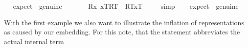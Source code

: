 \begin{isabellebody}
%
\endisadelimproof
\ \isamarkupfalse%
\ {\isacharbrackleft}expect\ {\isacharequal}\ genuine{\isacharbrackright}%
\isadelimproof
\ \ %
\endisadelimproof
%
\isatagproof
{}\isamarkupfalse%
\ %
%
\endisatagproof
{\isafoldproof}%
%
\isadelimproof
%
\endisadelimproof
\isanewline
\ \isamarkupfalse%
\ {\isachardoublequoteopen}{\isacharbrackleft}{\isacharparenleft}\isactrlbold {\isasymforall}R{\isachardot}\isactrlbold {\isasymforall}x{\isachardot}\ {\isasymlbrace}x\isactrlsup T{\isacharcomma}R\isactrlsup T{\isasymrbrace}\ \isactrlbold {\isasymrightarrow}\ {\isasymlparr}R\isactrlsup T{\isacharcomma}x\isactrlsup T{\isasymrparr}{\isacharparenright}{\isacharbrackright}\ {\isacharequal}\ {\isasymtop}{\isachardoublequoteclose}%
\isadelimproof
\ %
\endisadelimproof
%
\isatagproof
{}\isamarkupfalse%
\ simp%
\endisatagproof
{\isafoldproof}%
%
\isadelimproof
%
\endisadelimproof
\ \isamarkupfalse%
\ \ {\isacharbrackleft}expect\ {\isacharequal}\ genuine{\isacharbrackright}%
\isadelimproof
\ %
\endisadelimproof
%
\isatagproof
{}\isamarkupfalse%
\ %
%
\endisatagproof
{\isafoldproof}%
%
\isadelimproof
%
\endisadelimproof
%
\begin{isamarkuptext}%
With the first example we also want to illustrate the inflation of representations as caused by our
     embedding. For this note, that the statement  abbreviates the
    actual internal term  

\end{isamarkuptext}
\end{isabellebody}
